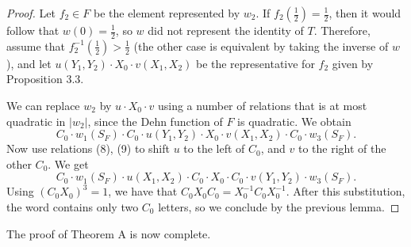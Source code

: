 \documentclass[10pt,a4paper]{article}
\newcommand{\sourcepagenumber}{editorial cover}
\newcommand{\SourcePage}[1]{\clearpage\gdef\sourcepagenumber{#1}}
\begin{document}
\begin{proof}
Let $f_2\in F$ be the element represented by $w_2$. If $f_2(\frac12)=\frac12$, then it would follow that $w(0)=\frac12$, so $w$ did not represent the identity of $T$. Therefore, assume that $f_2^{-1}(\frac12)>\frac12$ (the other case is equivalent by taking the inverse of $w$), and let $u(Y_1,Y_2)\cdot X_0\cdot v(X_1,X_2)$ be the representative for $f_2$ given by Proposition 3.3.

We can replace $w_2$ by $u\cdot X_0\cdot v$ using a number of relations that is at most quadratic in $|w_2|$, since the Dehn function of $F$ is quadratic. We obtain
\[
C_0\cdot w_1(S_F)\cdot C_0\cdot u(Y_1,Y_2)\cdot X_0\cdot v(X_1,X_2)\cdot C_0\cdot w_3(S_F).
\]
Now use relations (8), (9) to shift $u$ to the left of $C_0$, and $v$ to the right of the other $C_0$. We get
\[
C_0\cdot w_1(S_F)\cdot u(X_1,X_2)\cdot C_0\cdot X_0\cdot C_0\cdot v(Y_1,Y_2)\cdot w_3(S_F).
\]
Using $(C_0X_0)^3=1$, we have that $C_0X_0C_0=X_0^{-1}C_0X_0^{-1}$. After this substitution, the word contains only two $C_0$ letters, so we conclude by the previous lemma.
\end{proof}
The proof of Theorem A is now complete.

\SourcePage{13 (bibliography)}
\end{document}
